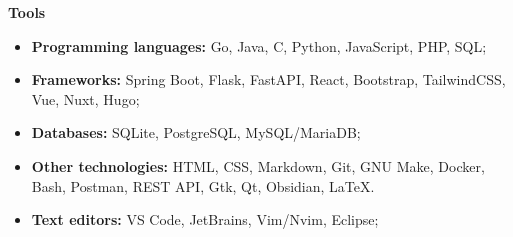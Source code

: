 {\vspace{0.5cm} \hspace{-0.5cm} \Large \textbf{Tools}}

\begin{itemize}
    \item \textbf{Programming languages:} Go, Java, C, Python, JavaScript, PHP, SQL;
    \item \textbf{Frameworks:} Spring Boot, Flask, FastAPI, React, Bootstrap, TailwindCSS, Vue, Nuxt, Hugo;
    \item \textbf{Databases:} SQLite, PostgreSQL, MySQL/MariaDB;
    \item \textbf{Other technologies:} HTML, CSS, Markdown, Git, GNU Make, Docker, Bash, Postman, 
        REST API, Gtk, Qt, Obsidian, LaTeX.
    \item \textbf{Text editors:} VS Code, JetBrains, Vim/Nvim, Eclipse;
\end{itemize}